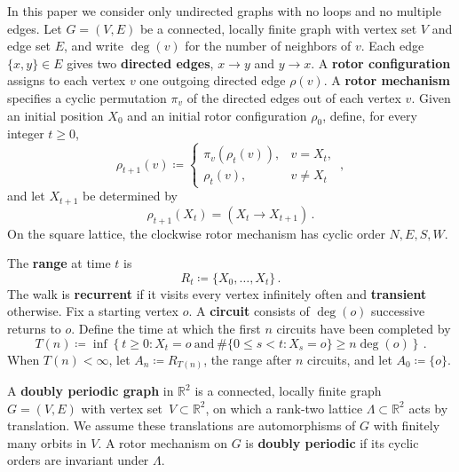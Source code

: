 \documentclass[11pt]{amsart}
\theoremstyle{plain}
\theoremstyle{definition}
\newcommand{\R}{\mathbb R}
\newcommand{\defn}[1]{\textbf{#1}}
\begin{document}
	In this paper we consider only undirected graphs with no loops and no
	multiple edges.  Let $G=(V,E)$ be a connected, locally finite graph with
	vertex set $V$ and edge set $E$, and write $\deg(v)$ for the number of
	neighbors of $v$.  Each edge $\{x,y\} \in E$ gives two
	\defn{directed edges}, $x\to y$ and $y\to x$.  A
	\defn{rotor configuration} assigns to each vertex $v$ one outgoing directed
	edge $\rho(v)$.  A \defn{rotor mechanism} specifies a cyclic permutation
	$\pi_v$ of the directed edges out of each vertex $v$.  Given an initial position $X_0$ and an
	initial rotor configuration $\rho_0$, define, for every integer $t\geq0$,
	\[
	\rho_{t+1}(v)
	\coloneqq
	\begin{cases}
		\pi_v(\rho_t(v)),&v=X_t,\\
		\rho_t(v),&v\ne X_t
	\end{cases}\, ,
	\]
	and let $X_{t+1}$ be determined by
	\[
	\rho_{t+1}(X_t)=(X_t\to X_{t+1})\, .
	\]
	On the square lattice, the clockwise rotor mechanism has cyclic order
	$N,E,S,W$.
	
	The \defn{range} at time $t$ is
	\[
	R_t\coloneqq\{X_0,\ldots,X_t\}\, .
	\]
	The walk is \defn{recurrent} if it visits every vertex infinitely often and
	\defn{transient} otherwise.  Fix a
	starting vertex $o$.  A \defn{circuit} consists of $\deg(o)$ successive
	returns to $o$.  Define the time at which the first $n$ circuits have been
	completed by
	\begin{equation}\label{eq:circ-time}
		T(n)\coloneqq
		\inf\left\{t\geq0:X_t=o\ \text{and}\ \#\{0\leq s<t:X_s=o\}
		\geq n\deg(o)\right\}\, .
	\end{equation}
	When $T(n)<\infty$, let $A_n\coloneqq R_{T(n)}$, the range after $n$
	circuits, and let $A_0\coloneqq\{o\}$.
	
	A \defn{doubly periodic graph} in $\R^2$ is a connected, locally finite
	graph $G=(V,E)$ with vertex set~$V\!\subset\R^2$, on which a rank-two lattice $\Lambda\subset\R^2$
	acts   by translation. We  assume these translations are   automorphisms of $G$ with finitely many  orbits in $V$.  
	A rotor mechanism on $G$ is \defn{doubly periodic} if its cyclic orders are
	invariant under $\Lambda$.
	
\end{document}
